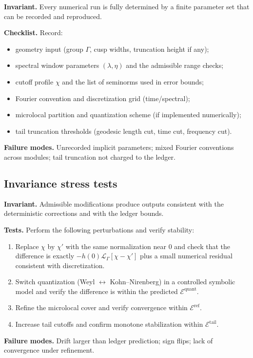 \begin{audit}
\label{audit:E.H1}
\textbf{Invariant.} Every numerical run is fully determined by a finite parameter set that can be recorded and
reproduced.

\textbf{Checklist.} Record:
\begin{itemize}
\item geometry input (group $\Gamma$, cusp widths, truncation height if any);
\item spectral window parameters $(\lambda,\eta)$ and the admissible range checks;
\item cutoff profile $\chi$ and the list of seminorms used in error bounds;
\item Fourier convention and discretization grid (time/spectral);
\item microlocal partition and quantization scheme (if implemented numerically);
\item tail truncation thresholds (geodesic length cut, time cut, frequency cut).
\end{itemize}

\textbf{Failure modes.} Unrecorded implicit parameters; mixed Fourier conventions across modules; tail truncation not
charged to the ledger.
\end{audit}

\subsection{Invariance stress tests}
\label{subsec:E.stress}

\begin{audit}
\label{audit:E.H2}
\textbf{Invariant.} Admissible modifications produce outputs consistent with the deterministic corrections and with
the ledger bounds.

\textbf{Tests.} Perform the following perturbations and verify stability:
\begin{enumerate}
\item Replace $\chi$ by $\chi'$ with the same normalization near $0$ and check that the difference is exactly
$-h(0)\mathcal{L}_\Gamma[\chi-\chi']$ plus a small numerical residual consistent with discretization.
\item Switch quantization (Weyl $\leftrightarrow$ Kohn--Nirenberg) in a controlled symbolic model and verify the
difference is within the predicted $\mathcal{E}^{\mathrm{quant}}$.
\item Refine the microlocal cover and verify convergence within $\mathcal{E}^{\mathrm{ref}}$.
\item Increase tail cutoffs and confirm monotone stabilization within $\mathcal{E}^{\mathrm{tail}}$.
\end{enumerate}

\textbf{Failure modes.} Drift larger than ledger prediction; sign flips; lack of convergence under refinement.
\end{audit}

